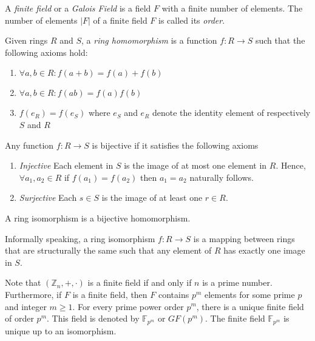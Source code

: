 \begin{defn}
\label{def:finite_field}
 A \textit{finite field} or a \textit{Galois Field} is a field $F$ with a finite number of elements. The number of elements $|F|$ of a finite field $F$ is called its \textit{order}.
\end{defn}

\begin{defn}
\label{def:ring_homomorphism}
 Given rings $R$ and $S$, a \textit{ring homomorphism} is a function $f: R \rightarrow S$ such that the following axioms hold:
 \begin{enumerate}
  \item $\forall a, b \in R: f \left( a + b \right) = f \left( a \right) + f \left( b \right)$
  \item $\forall a, b \in R: f \left( ab \right) = f \left( a \right) f \left( b \right)$
  \item $f \left( e_R \right) = f \left( e_S \right)$ where $e_S$ and $e_R$ denote the identity element of respectively $S$ and $R$
 \end{enumerate}
\end{defn}

\begin{defn}
\label{def:bijective_function} 
 Any function $f: R \rightarrow S$ is bijective if it satisfies the following axioms
 \begin{enumerate}
  \item \textit{Injective} Each element in $S$ is the image of at most one element in $R$. Hence, $\forall a_1, a_2 \in R$ if $f \left( a_1 \right) = f \left( a_2 \right)$ then $a_1 = a_2$ naturally follows.
  \item \textit{Surjective} Each $s \in S$ is the image of at least one $r \in R$.
 \end{enumerate}
\end{defn}

\begin{defn}
\label{def:ring_isomorphism}
 A ring isomorphism is a bijective homomorphism.
\end{defn}

Informally speaking, a ring isomorphism $f: R \rightarrow S$ is a mapping between rings that are structurally the same such that any element of $R$ has exactly one image in $S$.

Note that $\left( \mathbb{Z}_n, +, \cdot \right)$ is a finite field if and only if $n$ is a prime number. Furthermore, if $F$ is a finite field, then $F$ contains $p^m$ elements for some prime $p$ and integer $m \geq 1$. For every prime power order $p^m$, there is a unique finite field of order $p^m$. This field is denoted by $\mathbb{F}_{p^m}$ or $GF \left( p^m \right)$. The finite field $\mathbb{F}_{p^m}$ is unique up to an isomorphism. 


